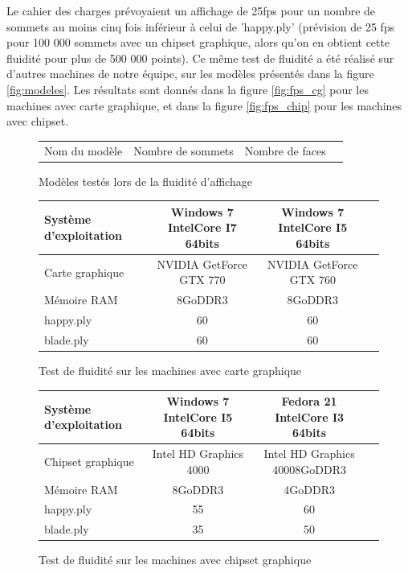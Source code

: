 Le cahier des charges prévoyaient un affichage de 25fps pour un nombre de sommets au moins cinq fois inférieur à celui de 'happy.ply' (prévision de 25 fps pour 100 000 sommets avec un chipset graphique, alors qu'on en obtient cette fluidité pour plus de 500 000 points). Ce même test de fluidité a été réalisé sur d'autres machines de notre équipe, sur les modèles présentés dans la figure \ref{fig:modeles}. Les résultats sont donnés dans la figure \ref{fig:fps_cg} pour les machines avec carte graphique, et dans la figure \ref{fig:fps_chip} pour les machines avec chipset.

\begin{figure}[h]
  \begin{changemargin}{-4cm}{-4cm}
    \centering
    \begin{tabular}{|l|c|c|c|}
      \hline
      Nom du modèle & Nombre de sommets & Nombre de faces
    \end{tabular}
  \end{changemargin}
  \caption{Modèles testés lors de la fluidité d'affichage}
  \label{tab:modeles}
\end{figure}

\begin{figure}[h]
  \begin{changemargin}{-4cm}{-4cm}
    \centering
    \begin{tabular}{|l|c|c|c|}
      \hline
      Système d'exploitation & Windows 7 IntelCore I7 64bits & Windows 7 IntelCore I5 64bits \\ \hline
      Carte graphique &  NVIDIA GetForce GTX 770 & NVIDIA GetForce GTX 760\\ \hline
      Mémoire RAM & 8GoDDR3 & 8GoDDR3 \\ \hline \hline
      happy.ply & 60 & 60  \\ \hline
      blade.ply & 60 & 60 \\ \hline
    \end{tabular}
  \end{changemargin}
  \caption{Test de fluidité sur les machines avec carte graphique}
  \label{tab:fps_cg}
\end{figure}

\begin{figure}[h]
  \begin{changemargin}{-4cm}{-4cm}
    \centering
    \begin{tabular}{|l|c|c|c|}
      \hline
      Système d'exploitation & Windows 7 IntelCore I5 64bits & Fedora 21 IntelCore I3 64bits\\ \hline
      Chipset graphique &  Intel HD Graphics 4000 & Intel HD Graphics 40008GoDDR3 \\ \hline
      Mémoire RAM & 8GoDDR3 & 4GoDDR3 \\ \hline \hline
      happy.ply & 55 & 60 \\ \hline
      blade.ply & 35 & 50 \\ \hline
    \end{tabular}
  \end{changemargin}
  \caption{Test de fluidité sur les machines avec chipset graphique}
  \label{tab:fps_chip}
\end{figure}

